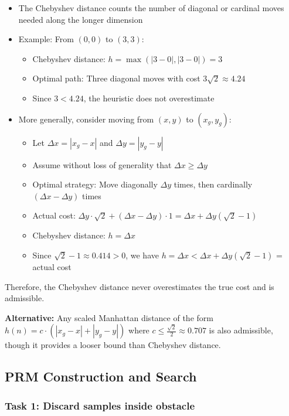 \documentclass[11pt]{article}
\begin{document}
\begin{itemize}
    \item The Chebyshev distance counts the number of diagonal or cardinal moves needed along the longer dimension
    \item Example: From $(0,0)$ to $(3,3)$:
    \begin{itemize}
        \item Chebyshev distance: $h = \max(|3-0|, |3-0|) = 3$
        \item Optimal path: Three diagonal moves with cost $3\sqrt{2} \approx 4.24$
        \item Since $3 < 4.24$, the heuristic does not overestimate
    \end{itemize}
    \item More generally, consider moving from $(x, y)$ to $(x_g, y_g)$:
    \begin{itemize}
        \item Let $\Delta x = |x_g - x|$ and $\Delta y = |y_g - y|$
        \item Assume without loss of generality that $\Delta x \geq \Delta y$
        \item Optimal strategy: Move diagonally $\Delta y$ times, then cardinally $(\Delta x - \Delta y)$ times
        \item Actual cost: $\Delta y \cdot \sqrt{2} + (\Delta x - \Delta y) \cdot 1 = \Delta x + \Delta y(\sqrt{2} - 1)$
        \item Chebyshev distance: $h = \Delta x$
        \item Since $\sqrt{2} - 1 \approx 0.414 > 0$, we have $h = \Delta x < \Delta x + \Delta y(\sqrt{2} - 1)$ = actual cost
    \end{itemize}
\end{itemize}

Therefore, the Chebyshev distance never overestimates the true cost and is admissible.

\textbf{Alternative:} Any scaled Manhattan distance of the form $h(n) = c \cdot (|x_g - x| + |y_g - y|)$ where $c \leq \frac{\sqrt{2}}{2} \approx 0.707$ is also admissible, though it provides a looser bound than Chebyshev distance.

\subsection{PRM Construction and Search}

\subsubsection{Task 1: Discard samples inside obstacle}
\end{document}
